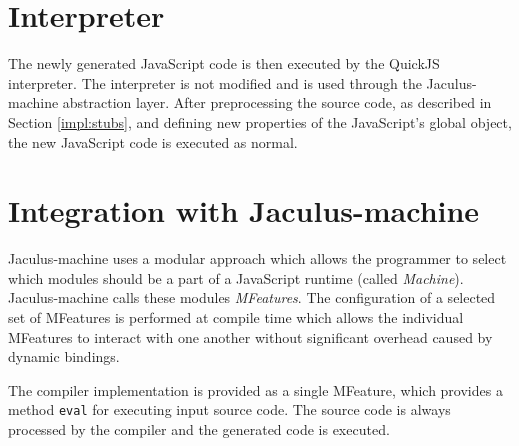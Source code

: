 \section{Interpreter}

The newly generated JavaScript code is then executed by the QuickJS interpreter. The interpreter is not modified and is used through the Jaculus-machine abstraction layer. After preprocessing the source code, as described in Section \ref{impl:stubs}, and defining new properties of the JavaScript's global object, the new JavaScript code is executed as normal.

\section{Integration with Jaculus-machine}

Jaculus-machine uses a modular approach which allows the programmer to select which modules should be a part of a JavaScript runtime (called \textit{Machine}). Jaculus-machine calls these modules \textit{MFeatures}. The configuration of a selected set of MFeatures is performed at compile time which allows the individual MFeatures to interact with one another without significant overhead caused by dynamic bindings.

The compiler implementation is provided as a single MFeature, which provides a method \texttt{eval} for executing input source code. The source code is always processed by the compiler and the generated code is executed.
